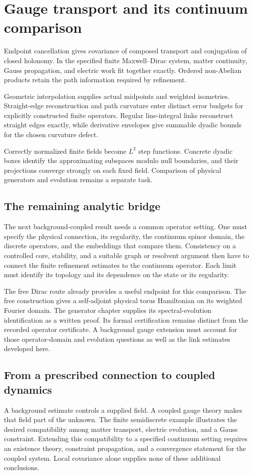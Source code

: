 \section{Gauge transport and its continuum comparison}
Endpoint cancellation gives covariance of composed transport and conjugation of closed holonomy. In the specified finite Maxwell--Dirac system, matter continuity, Gauss propagation, and electric work fit together exactly. Ordered non-Abelian products retain the path information required by refinement.

Geometric interpolation supplies actual midpoints and weighted isometries. Straight-edge reconstruction and path curvature enter distinct error budgets for explicitly constructed finite operators. Regular line-integral links reconstruct straight edges exactly, while derivative envelopes give summable dyadic bounds for the chosen curvature defect.

Correctly normalized finite fields become $L^2$ step functions. Concrete dyadic boxes identify the approximating subspaces modulo null boundaries, and their projections converge strongly on each fixed field. Comparison of physical generators and evolution remains a separate task.

\subsection{The remaining analytic bridge}
The next background-coupled result needs a common operator setting. One must specify the physical connection, its regularity, the continuum spinor domain, the discrete operators, and the embeddings that compare them. Consistency on a controlled core, stability, and a suitable graph or resolvent argument then have to connect the finite refinement estimates to the continuum operator. Each limit must identify its topology and its dependence on the state or its regularity.

The free Dirac route already provides a useful endpoint for this comparison. The free construction gives a self-adjoint physical torus Hamiltonian on its weighted Fourier domain. The generator chapter supplies its spectral-evolution identification as a written proof. Its formal certification remains distinct from the recorded operator certificate. A background gauge extension must account for those operator-domain and evolution questions as well as the link estimates developed here.

\subsection{From a prescribed connection to coupled dynamics}
A background estimate controls a supplied field. A coupled gauge theory makes that field part of the unknown. The finite semidiscrete example illustrates the desired compatibility among matter transport, electric evolution, and a Gauss constraint. Extending this compatibility to a specified continuum setting requires an existence theory, constraint propagation, and a convergence statement for the coupled system. Local covariance alone supplies none of these additional conclusions.


